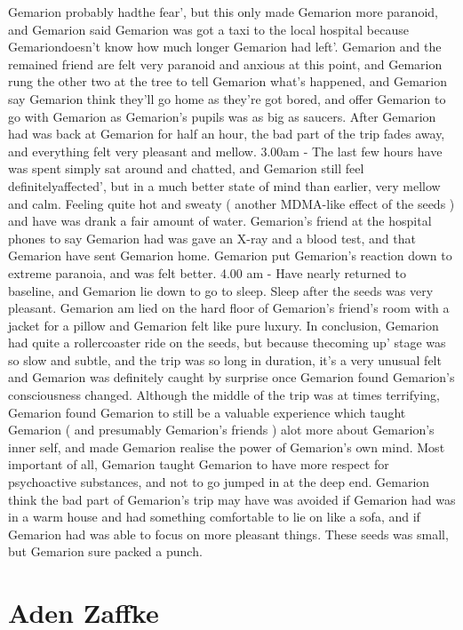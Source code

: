 \documentclass[12pt]{book}
\begin{document}
Gemarion probably hadthe fear', but this only made Gemarion more paranoid, and Gemarion said Gemarion was got a taxi to the local hospital because Gemariondoesn't know how much longer Gemarion had left'. Gemarion and the remained friend are felt very paranoid and anxious at this point, and Gemarion rung the other two at the tree to tell Gemarion what's happened, and Gemarion say Gemarion think they'll go home as they're got bored, and offer Gemarion to go with Gemarion as Gemarion's pupils was as big as saucers. After Gemarion had was back at Gemarion for half an hour, the bad part of the trip fades away, and everything felt very pleasant and mellow. 3.00am - The last few hours have was spent simply sat around and chatted, and Gemarion still feel definitelyaffected', but in a much better state of mind than earlier, very mellow and calm. Feeling quite hot and sweaty ( another MDMA-like effect of the seeds ) and have was drank a fair amount of water. Gemarion's friend at the hospital phones to say Gemarion had was gave an X-ray and a blood test, and that Gemarion have sent Gemarion home. Gemarion put Gemarion's reaction down to extreme paranoia, and was felt better. 4.00 am - Have nearly returned to baseline, and Gemarion lie down to go to sleep. Sleep after the seeds was very pleasant. Gemarion am lied on the hard floor of Gemarion's friend's room with a jacket for a pillow and Gemarion felt like pure luxury. In conclusion, Gemarion had quite a rollercoaster ride on the seeds, but because thecoming up' stage was so slow and subtle, and the trip was so long in duration, it's a very unusual felt and Gemarion was definitely caught by surprise once Gemarion found Gemarion's consciousness changed. Although the middle of the trip was at times terrifying, Gemarion found Gemarion to still be a valuable experience which taught Gemarion ( and presumably Gemarion's friends ) alot more about Gemarion's inner self, and made Gemarion realise the power of Gemarion's own mind. Most important of all, Gemarion taught Gemarion to have more respect for psychoactive substances, and not to go jumped in at the deep end. Gemarion think the bad part of Gemarion's trip may have was avoided if Gemarion had was in a warm house and had something comfortable to lie on like a sofa, and if Gemarion had was able to focus on more pleasant things. These seeds was small, but Gemarion sure packed a punch.



\chapter{Aden Zaffke}
\end{document}
